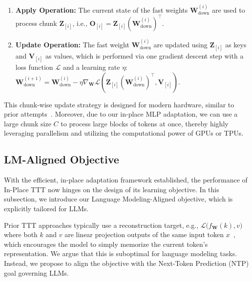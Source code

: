 \begin{enumerate}
\setlength\itemsep{2pt}
    \item \textbf{Apply Operation:} The current state of the fast weights $\mathbf{W}_{\mathrm{down}}^{(i)}$ are used to process chunk $\mathbf{\mathbf{Z}}_{[i]}$, i.e., $\mathbf{O}_{[i]} = \mathbf{Z}_{[i]} (\mathbf{W}_{\mathrm{down}}^{(i)})^\top$.
    \item \textbf{Update Operation:} The fast weight $\mathbf{W}_{\mathrm{down}}^{(i)}$ are updated using $\mathbf{Z}_{[i]}$ as keys and $\mathbf{V}_{[i]}$ as values, which is performed via one gradient descent step with a loss function $\mathcal{L}$ and a learning rate $\eta$:
    $
        \mathbf{W}_{\mathrm{down}}^{(i+1)} = \mathbf{W}_{\mathrm{down}}^{(i)} - \eta \nabla_{\mathbf{W}} \mathcal{L}\left( \mathbf{Z}_{[i]} (\mathbf{W}_{\mathrm{down}}^{(i)})^\top, \textbf{V}_{[i]} \right).
    $
\end{enumerate}


This chunk-wise update strategy is designed for modern hardware, similar to prior attempts~\citep{li2025tnt,sun2023retentive,behrouz2024titans,irie2025fastweightprogramminglinear}. Moreover, due to our in-place MLP adaptation, we can use a large chunk size $C$ to process large blocks of tokens at once, thereby highly leveraging parallelism and utilizing the computational power of GPUs or TPUs.

\subsection{LM-Aligned Objective}
\label{sec:value_and_loss}

With the efficient, in-place adaptation framework established, the performance of In-Place TTT now hinges on the design of its learning objective. In this subsection, we introduce our Language Modeling-Aligned objective, which is explicitly tailored for LLMs.

Prior TTT approaches typically use a reconstruction target, e.g., $\mathcal{L}\big(f_{\mathbf{W}}(k), v\big)$ where both $k$ and $v$ are linear projection outputs of the same input token $x$~\citep{sun2020ttt,sun2024tttLayers,zhang2025tttdr}, which encourages the model to simply memorize the current token's representation. We argue that this is suboptimal for language modeling tasks. Instead, we propose to align the objective with the Next-Token Prediction (NTP) goal governing LLMs. 

